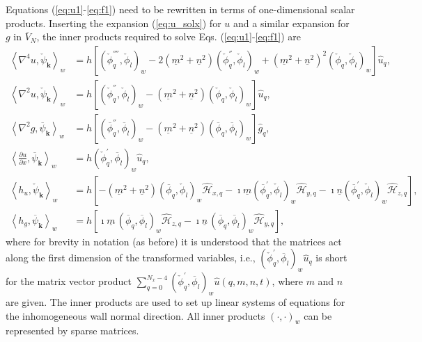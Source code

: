 \documentclass[11pt, oneside]{elsarticle}
\newcommand{\N}[1]{\check{#1}}
\newcommand{\D}[1]{\overline{#1}}
\begin{document}
Equations (\ref{eq:u1}-\ref{eq:f1}) need to be rewritten in terms of one-dimensional scalar products. 
Inserting the expansion (\ref{eq:u_solx}) for $u$ and a similar expansion for $g$ in $\D{V}_N$, the inner products required to solve Eqs. (\ref{eq:u1}-\ref{eq:f1}) are
\begin{align}
\left<\nabla^4u, \N{\psi}_{\bm{k}}\right>_w &= h\left[ \left( 
\N{\phi}_q^{''''}, 
\N{\phi}_l\right)_w -2(\underline{m}^2+\underline{n}^2) \left( \N{\phi}_q^{''}, 
\N{\phi}_l\right)_w + (\underline{m}^2+\underline{n}^2)^2\left( \N{\phi}_q, 
\N{\phi}_l\right)_w  \right] \hat{u}_q, \\
\left< \nabla^2 u, \N{\psi}_{\bm{k}}\right>_w &= h\left[\left( \N{\phi}_q^{''}, 
\N{\phi}_l\right)_w - (\underline{m}^2+\underline{n}^2)\left( \N{\phi}_q, 
\N{\phi}_l \right)_w \right] \hat{u}_q, \\
\left< \nabla^2 g, \D{\psi}_{\bm{k}}\right>_w &= h\left[\left( \D{\phi}_q^{''}, 
\D{\phi}_l\right)_w - (\underline{m}^2+\underline{n}^2)\left( \D{\phi}_q, 
\D{\phi}_l \right)_w \right] \hat{g}_q, \\
\left<\frac{\partial u}{\partial x}, \D{\psi}_{\bm{k}}\right>_w &=
h\left(\N{\phi}_q^{'}, \D{\phi}_l\right)_w \hat{u}_q, \\
\left<h_u, \N{\psi}_{\bm{k}} \right>_w &= 
h\left[-(\underline{m}^2+\underline{n}^2) 
\left(\D{\phi}_q, 
\N{\phi}_l \right)_w \hat{\mathcal{H}}_{x, q} - \imath \underline{m}\left(\D{\phi}_q^{'}, 
\N{\phi}_l \right)_w \hat{\mathcal{H}}_{y, q} - \imath 
\underline{n}\left(\D{\phi}_q^{'}, \N{\phi}_l \right)_w 
\hat{\mathcal{H}}_{z, q}\right], \label{eq:S_hv}
\\
\left< h_g, \D{\psi}_{\bm{k}} \right>_w &= h\left[ \imath \underline{m}\, \left(\D{\phi}_q, \D{\phi}_l \right)_w 
\hat{\mathcal{H}}_{z, q} - \imath \underline{n}\, \left(\D{\phi}_q, \D{\phi}_l \right)_w \hat{\mathcal{H}}_{y, q} 
\right],\label{eq:S_hg}
\end{align}
where for brevity in notation (as before) it is understood that the matrices 
act along the first dimension of the transformed variables, i.e.,  $ 
\left(\N{\phi}_q^{'}, \D{\phi}_l\right)_w \hat{u}_q$ is short for the matrix 
vector product $ \sum_{q=0}^{N_x-4}\left( \N{\phi}_q^{'}, \D{\phi}_l\right)_w 
\hat{u}(q, {m}, {n}, t)$, where $m$ and $n$ are given. The inner products are used to set up linear systems 
of equations for the inhomogeneous wall normal direction. All inner products 
$\left(\cdot, \cdot\right)_w$ can be represented by sparse matrices.
\end{document}

